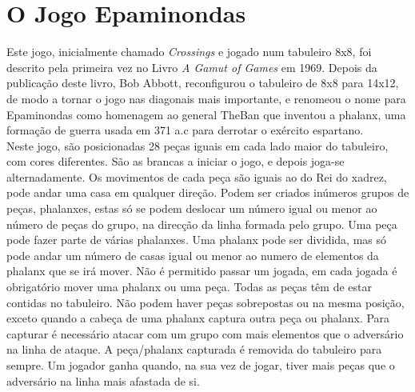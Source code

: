 \documentclass[a4paper]{article}
\begin{document}










\section{O Jogo Epaminondas}
Este jogo, inicialmente chamado \textit{Crossings} e jogado num tabuleiro 8x8, foi descrito pela primeira vez no Livro \textit{A Gamut of Games} em 1969.
Depois da publicação deste livro, Bob Abbott, reconfigurou o tabuleiro de 8x8 para 14x12, de modo a tornar o jogo nas diagonais mais importante, e renomeou
o nome para Epaminondas como homenagem ao general TheBan que inventou a phalanx, uma formação de guerra usada em 371 a.c para derrotar o exército espartano.\cite{creator,rules}
\\\linebreak
Neste jogo, são posicionadas 28 peças iguais em cada lado maior do tabuleiro, com cores diferentes. São as brancas a iniciar o jogo, e depois joga-se alternadamente. Os movimentos de cada peça são iguais ao do Rei do xadrez, pode andar uma casa em qualquer direção. Podem ser criados inúmeros grupos de peças, phalanxes, estas só se podem deslocar um número igual ou menor ao número de peças do grupo, na direcção da linha formada pelo grupo. Uma peça pode fazer parte de várias phalanxes. Uma phalanx pode ser dividida, mas só pode andar um número de casas igual ou menor ao numero de elementos da phalanx que se irá mover. Não é permitido passar um jogada, em cada jogada é obrigatório mover uma phalanx ou uma peça. Todas as peças têm de estar contidas no tabuleiro. Não podem haver peças sobrepostas ou na mesma posição, exceto quando a cabeça de uma phalanx captura outra peça ou phalanx. Para capturar é necessário atacar com um grupo com mais elementos que o adversário na linha de ataque. A peça/phalanx capturada é removida do tabuleiro para sempre. Um jogador ganha quando, na sua vez de jogar, tiver mais peças que o adversário na linha mais afastada de si.\cite{rules}
\end{document}
